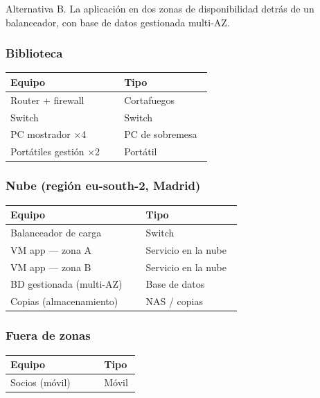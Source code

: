 Alternativa B. La aplicación en dos zonas de disponibilidad detrás de un balanceador, con base de datos gestionada multi-AZ.

\subsubsection*{Biblioteca}

{\small
\begin{longtable}{@{}>{\raggedright\arraybackslash}p{0.534\linewidth}>{\raggedright\arraybackslash}p{0.415\linewidth}@{}}
\toprule
\textbf{Equipo} & \textbf{Tipo} \\
\midrule
\endhead
Router + firewall & Cortafuegos \\
Switch & Switch \\
PC mostrador ×4 & PC de sobremesa \\
Portátiles gestión ×2 & Portátil \\
\bottomrule
\end{longtable}}

\subsubsection*{Nube (región eu-south-2, Madrid)}

{\small
\begin{longtable}{@{}>{\raggedright\arraybackslash}p{0.551\linewidth}>{\raggedright\arraybackslash}p{0.398\linewidth}@{}}
\toprule
\textbf{Equipo} & \textbf{Tipo} \\
\midrule
\endhead
Balanceador de carga & Switch \\
VM app — zona A & Servicio en la nube \\
VM app — zona B & Servicio en la nube \\
BD gestionada (multi-AZ) & Base de datos \\
Copias (almacenamiento) & NAS / copias \\
\bottomrule
\end{longtable}}

\subsubsection*{Fuera de zonas}

{\small
\begin{longtable}{@{}>{\raggedright\arraybackslash}p{0.686\linewidth}>{\raggedright\arraybackslash}p{0.263\linewidth}@{}}
\toprule
\textbf{Equipo} & \textbf{Tipo} \\
\midrule
\endhead
Socios (móvil) & Móvil \\
\bottomrule
\end{longtable}}

